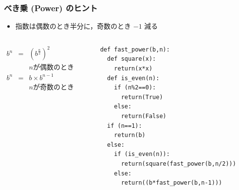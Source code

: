 \begin{frame}
\frametitle{べき乗 (Power) のヒント}
  \begin{itemize}
\item 指数は偶数のとき半分に，奇数のとき $-1$ 減る
  \end{itemize}
  \begin{columns}
    \begin{column}{0.45\textwidth}
      \begin{math}
        \begin{array}{rcl}
b^n &=& (b^{\frac{n}{2}})^{2}\\
&& n \mbox{が偶数のとき}\\
b^n &=& b \times b^{n-1}\\
&& n \mbox{が奇数のとき}
        \end{array}
      \end{math}
    \end{column}
    \begin{column}{0.5\textwidth}
      \begin{lstlisting}[caption={power.py},label=fast_power]
def fast_power(b,n):
  def square(x):
    return(x*x)
  def is_even(n):
    if (n%2==0):
      return(True)
    else:
      return(False)
  if (n==1):
    return(b) 
  else:
    if (is_even(n)):
      return(square(fast_power(b,n/2)))
    else:
      return((b*fast_power(b,n-1)))
      \end{lstlisting}
    \end{column}
  \end{columns}
\end{frame}
